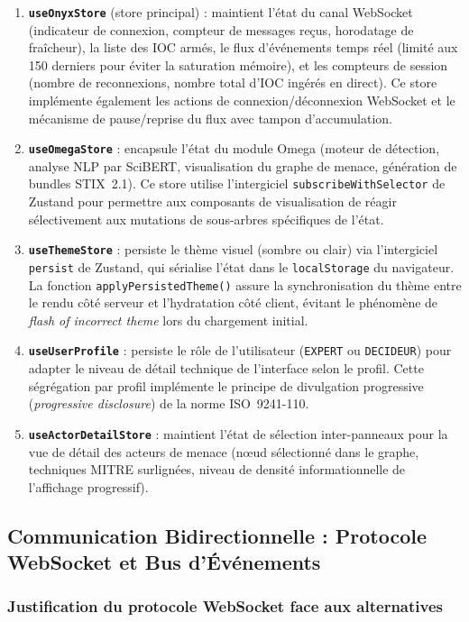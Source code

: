 \begin{enumerate}
    \item \textbf{\texttt{useOnyxStore}} (store principal) : maintient l'état du canal WebSocket (indicateur de connexion, compteur de messages reçus, horodatage de fraîcheur), la liste des IOC armés, le flux d'événements temps réel (limité aux 150 derniers pour éviter la saturation mémoire), et les compteurs de session (nombre de reconnexions, nombre total d'IOC ingérés en direct). Ce store implémente également les actions de connexion/déconnexion WebSocket et le mécanisme de pause/reprise du flux avec tampon d'accumulation.
    \item \textbf{\texttt{useOmegaStore}} : encapsule l'état du module Omega (moteur de détection, analyse NLP par SciBERT, visualisation du graphe de menace, génération de bundles STIX~2.1). Ce store utilise l'intergiciel \texttt{subscribeWithSelector} de Zustand pour permettre aux composants de visualisation de réagir sélectivement aux mutations de sous-arbres spécifiques de l'état.
    \item \textbf{\texttt{useThemeStore}} : persiste le thème visuel (sombre ou clair) via l'intergiciel \texttt{persist} de Zustand, qui sérialise l'état dans le \texttt{localStorage} du navigateur. La fonction \texttt{applyPersistedTheme()} assure la synchronisation du thème entre le rendu côté serveur et l'hydratation côté client, évitant le phénomène de \textit{flash of incorrect theme} lors du chargement initial.
    \item \textbf{\texttt{useUserProfile}} : persiste le rôle de l'utilisateur (\texttt{EXPERT} ou \texttt{DECIDEUR}) pour adapter le niveau de détail technique de l'interface selon le profil. Cette ségrégation par profil implémente le principe de divulgation progressive (\textit{progressive disclosure}) de la norme ISO~9241-110.
    \item \textbf{\texttt{useActorDetailStore}} : maintient l'état de sélection inter-panneaux pour la vue de détail des acteurs de menace (nœud sélectionné dans le graphe, techniques MITRE surlignées, niveau de densité informationnelle de l'affichage progressif).
\end{enumerate}

\subsection{Communication Bidirectionnelle : Protocole WebSocket et Bus d'Événements}

\subsubsection{Justification du protocole WebSocket face aux alternatives}

